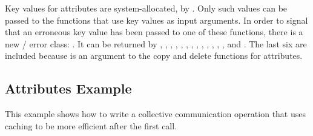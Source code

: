 Key values for attributes are system-allocated, by
%
%
%
. Only such values can be passed to the
functions that use key values as input arguments. In order to signal that
an erroneous key value has been passed to one of these functions,
there is a new \MPI/ error class: . It can be
returned by , ,
, ,
%
%
%
%
%
%
%
%
%
%
%
%
,
,
,
,
, ,
, ,
, and . The
last six are included
because  is an argument to the copy and delete functions for
attributes.

\subsection{Attributes Example}
\label{ex:comm-attributes}
\begin{users}
This example shows how to write a collective communication operation
that uses caching to be more efficient after the first call.
\end{users}

